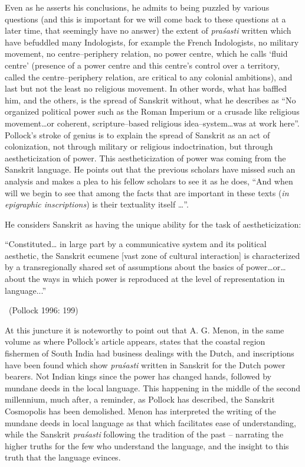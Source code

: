Even as he asserts his conclusions, he admits to being puzzled by various questions (and this is important for we will come back to these questions at a later time, that seemingly have no answer) the extent of \textit{praśasti} written which have befuddled many Indologists, for example the French Indologists, no military movement, no centre–periphery relation, no power centre, which he calls ‘fluid centre’ (presence of a power centre and this centre’s control over a territory, called the centre–periphery relation, are critical to any colonial ambitions), and last but not the least no religious movement. In other words, what has baffled him, and the others, is the spread of Sanskrit without, what he describes as “No organized political power such as the Roman Imperium or a crusade like religious movement…or coherent, scripture–based religious idea–system…was at work here”. Pollock’s stroke of genius is to explain the spread of Sanskrit as an act of colonization, not through military or religious indoctrination, but through aestheticization of power. This aestheticization of power was coming from the Sanskrit language. He points out that the previous scholars have missed such an analysis and makes a plea to his fellow scholars to see it as he does, “And when will we begin to see that among the facts that are important in these texts (\textit{in epigraphic inscriptions}) is their textuality itself …”.

He considers Sanskrit as having the unique ability for the task of aestheticization:

\begin{myquote}
“Constituted… in large part by a communicative system and its political aesthetic, the Sanskrit ecumene [vast zone of cultural interaction] is characterized by a transregionally shared set of assumptions about the basics of power…or…about the ways in which power is reproduced at the level of representation in language...” 

~\hfill (Pollock 1996: 199)
\end{myquote}

At this juncture it is noteworthy to point out that A. G. Menon, in the same volume as where Pollock’s article appears, states that the coastal region fishermen of South India had business dealings with the Dutch, and inscriptions have been found which show \textit{praśasti} written in Sanskrit for the Dutch power bearers. Not Indian kings since the power has changed hands, followed by mundane deeds in the local language. This happening in the middle of the second millennium, much after, a reminder, as Pollock has described, the Sanskrit Cosmopolis has been demolished. Menon has interpreted the writing of the mundane deeds in local language as that which facilitates ease of understanding, while the Sanskrit \textit{praśasti} following the tradition of the past – narrating the higher truths for the few who understand the language, and the insight to this truth that the language evinces.


